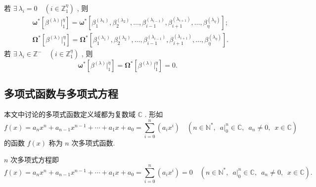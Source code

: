 \documentclass{article}
\renewcommand\.{.\hspace{3pt}}
\renewcommand\,{,\hspace{4pt}}
\renewcommand\:{:\hspace{3pt}}
\newcommand\A{,\hspace{6pt}}
\begin{document}
	若 $\exists \ \lambda_{i} = 0 \quad \left( i \in \mathbb{Z}_{1}^{\eta} \right)$ \, 则
	\begin{align*}
		& \bm{\omega^{\ast}} \left[ \beta^{\left( \lambda \right)} |_{1}^{\eta} \right] = \bm{\omega^{\ast}} \left[ \beta_{1}^{\left( \lambda_{1} \right)} , \beta_{2}^{\left( \lambda_{2} \right)} , \ldots , \beta_{i-1}^{\left( \lambda_{i-1} \right)} , \beta_{i+1}^{\left( \lambda_{i+1} \right)} , \ldots , \beta_{\eta}^{\left( \lambda_{\eta} \right)} \right] ; \\
		& \bm{\Omega^{\ast}} \left[ \beta^{\left( \lambda \right)} |_{1}^{\eta} \right] = \bm{\Omega^{\ast}} \left[ \beta_{1}^{\left( \lambda_{1} \right)} , \beta_{2}^{\left( \lambda_{2} \right)} , \ldots , \beta_{i-1}^{\left( \lambda_{i-1} \right)} , \beta_{i+1}^{\left( \lambda_{i+1} \right)} , \ldots , \beta_{\eta}^{\left( \lambda_{\eta} \right)} \right] \.
	\end{align*}
	若 $\exists \ \lambda_{i} \in \mathbb{Z}^{-} \quad \left( i \in \mathbb{Z}_{1}^{\eta} \right)$ \, 则
	\begin{equation*}
		\bm{\omega^{\ast}} \left[ \beta^{\left( \lambda \right)} |_{1}^{\eta} \right] = \bm{\Omega^{\ast}} \left[ \beta^{\left( \lambda \right)} |_{1}^{\eta} \right] = 0 \.
	\end{equation*}
	
	\subsection{多项式函数与多项式方程}
	本文中讨论的多项式函数定义域都为复数域 $\mathbb{C}$ \. 形如
	\begin{equation}
		f(x) = a_{n} x^{n} + a_{n-1} x^{n-1} + \cdots + a_{1} x + a_{0} = \sum_{i=0}^{n} \left( a_{i} x^{i} \right) \quad \left( n \in \mathbb{N^{\ast}} \A a |_{0}^{n} \in \mathbb{C} \A a_{n} \neq 0 \A x \in \mathbb{C} \right)
	\end{equation}
	的函数 $f(x)$ 称为 $n$ 次多项式函数\.
	
	$n$ 次多项式方程即
	\begin{equation}
		f(x) = a_{n} x^{n} + a_{n-1} x^{n-1} + \cdots + a_{1} x + a_{0} = \sum_{i=0}^{n} \left( a_{i} x^{i} \right) = 0 \quad \left( n \in \mathbb{N^{\ast}} \A a |_{0}^{n} \in \mathbb{C} \A a_{n} \neq 0 \A x \in \mathbb{C} \right) \.
	\end{equation}
\end{document}
